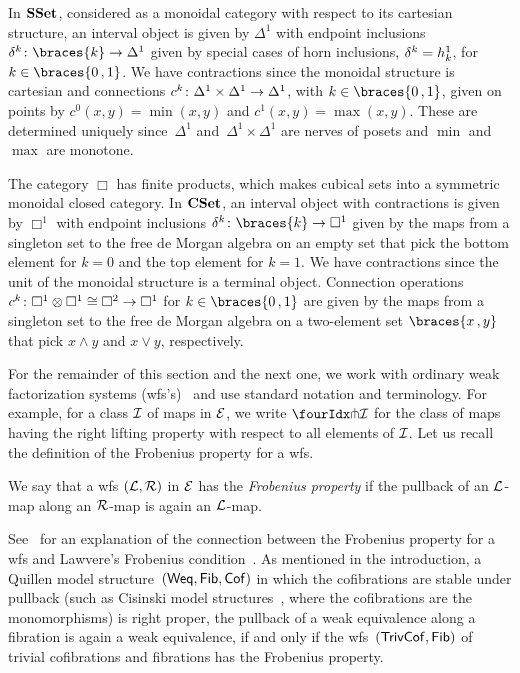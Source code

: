 \documentclass[reqno,10pt,a4paper,oneside,draft]{amsart}
\begin{document}
\begin{example} \label{exa:cyl-in-sset}
In $\SSet$, considered as a monoidal category with respect to its cartesian structure, an interval object is given by $\Delta^1$ with endpoint inclusions~$\kcyl  \co \braces{k} \to \Delta^1$ given by special cases of horn inclusions, $\kcyl = h^1_k$, for $k \in \braces{0\,, 1}$.
We have contractions since the monoidal structure is cartesian and connections $c^k \co \Delta^1 \times \Delta^1 \to \Delta^1$, with $k \in \braces{0\,, 1}$, given on points by $c^0(x, y) = \min(x, y)$ and $c^1(x, y) = \max(x, y)$.
These are  determined uniquely since~$\Delta^1$ and~$\Delta^1 \times \Delta^1$ are nerves of posets and $\min$ and $\max$ are monotone.
\end{example}

\begin{example} \label{exa:cyl-in-cuset}
The category $\Box$ has finite products, which makes cubical sets into a symmetric monoidal closed category.
In $\CSet$, an interval object with contractions is given by $\Box^1$ with endpoint inclusions $\kcyl \co \braces{k} \to \Box^1$ given by the maps from a singleton set to the free de Morgan algebra on an empty set that pick the bottom element for $k = 0$ and the top element for $k =1$.
We have contractions since the unit of the monoidal structure is a terminal object.
Connection operations $c^k \co \Box^1 \otimes \Box^1 \iso \Box^2 \to \Box^1$ for $k \in \braces{0\,, 1}$ are given by the maps from a singleton set to the free de Morgan algebra on a two-element set $\braces{x\,, y}$ that pick $x \wedge y$ and $x \vee y$, respectively.
\end{example}

For the remainder of this section and the next one, we work with ordinary weak factorization systems (wfs's)~\cite{bousfield-wfs} and use standard notation and terminology.
For example, for a class $\cal{I}$ of maps in $\cal{E}$, we write $\liftr{\cal{I}}$ for the class of maps having the right lifting property with respect to all elements of $\cal{I}$. Let us recall the definition of the Frobenius property for a wfs. 

\begin{definition}
We say that a wfs $(\cal{L}, \cal{R})$ in $\cal{E}$ has the \emph{Frobenius property} if the pullback of an $\cal{L}$-map along an 
$\cal{R}$-map is again an $\cal{L}$-map.
\end{definition}

See~\cite{clementino:frobenius} for an explanation of the connection between the Frobenius property for a wfs and 
Lawvere's Frobenius condition~\cite{lawvere-equality}.
As mentioned in the introduction, a Quillen model structure~$(\mathsf{Weq}, \Fib, \Cof)$ in which the cofibrations are stable under pullback (such as Cisinski model structures~\cite{cisinski-asterisque}, where the cofibrations are the monomorphisms) is right proper, \ie the pullback of a weak equivalence along a fibration is again a weak equivalence, if and only if the wfs~$(\TrivCof, \Fib)$ of trivial cofibrations and fibrations has the Frobenius property.
\end{document}
